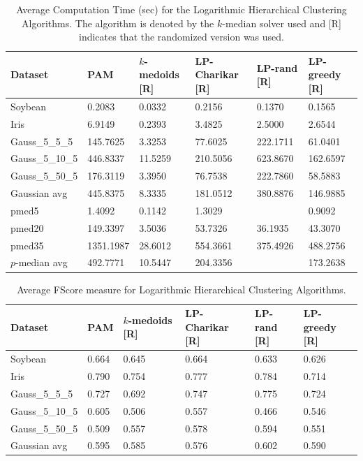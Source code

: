 \documentclass[conference, 10pt, final]{IEEEtran}
\begin{document}
\begin{table}[!t]
\caption{Average Computation Time (sec) for the Logarithmic Hierarchical Clustering Algorithms. The algorithm is denoted by the $k$-median solver used and [R] indicates that the randomized version was used.}
\centering
\begin{tabular}{ | l | l | l | l | l | l | }
\hline
Dataset	&	PAM	&	$k$-medoids [R]	&	LP-Charikar [R]	&	LP-rand [R]	&	LP-greedy [R]	\\ \hline
Soybean	&	0.2083	&	0.0332	&	0.2156	&	0.1370	&	0.1565	\\
Iris	&	6.9149	&	0.2393	&	3.4825	&	2.5000	&	2.6544	\\
Gauss\_5\_5\_5	&	145.7625	&	3.3253	&	77.6025	&	222.1711	&	61.0401	\\
Gauss\_5\_10\_5	&	446.8337	&	11.5259	&	210.5056	&	623.8670 	&	162.6597	\\
Gauss\_5\_50\_5	&	176.3119	&	3.3950	&	76.7538	&	222.7860 	&	58.5883	\\
Gaussian avg	&	445.8375	&	8.3335	&	181.0512	&	380.8876 	&	146.9885	\\
pmed5	&	1.4092	&	0.1142	&	1.3029	&		&	0.9092	\\
pmed20	&	149.3397	&	3.5036	&	53.7326	&	36.1935	&	43.3070	\\
pmed35	&	1351.1987	&	28.6012	&	554.3661	&	375.4926	&	488.2756	\\
$p$-median avg	&	492.7771	&	10.5447	&	204.3356	&		&	173.2638	\\ \hline
\end{tabular}
\label{fig:hier_log_results_comp}
\end{table}

\begin{table}[!t]
\caption{Average FScore measure for Logarithmic Hierarchical Clustering Algorithms.}
\centering
\begin{tabular}{ | l | l | l | l | l | l | }
\hline
Dataset	&	PAM	&	$k$-medoids [R]	&	LP-Charikar [R]	&	LP-rand [R]	&	LP-greedy [R]	\\ \hline
Soybean	&	0.664	&	0.645	&	0.664	&	0.633	&	0.626	\\
Iris	&	0.790	&	0.754	&	0.777	&	0.784	&	0.714	\\
Gauss\_5\_5\_5	&	0.727	&	0.692	&	0.747	&	0.775	&	0.724	\\
Gauss\_5\_10\_5	&	0.605	&	0.506	&	0.557	&	0.466	&	0.546	\\
Gauss\_5\_50\_5	&	0.509	&	0.557	&	0.578	&	0.594	&	0.551	\\
Gaussian avg	&	0.595	&	0.585	&	0.576	&	0.602	&	0.590	\\ \hline
\end{tabular}
\label{fig:hier_log_results_FScore}
\end{table}
\end{document}
